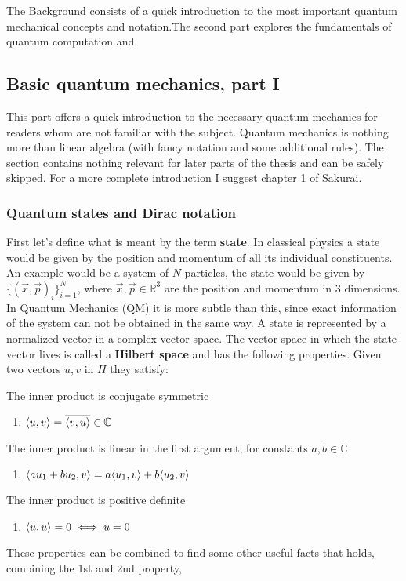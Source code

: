 The Background consists of a quick introduction to the most important quantum mechanical concepts and notation.The second part explores the fundamentals of quantum computation and 

\subsection{Basic quantum mechanics, part I}
This part offers a quick introduction to the necessary quantum mechanics for readers whom are not familiar with the subject. Quantum mechanics is nothing more than linear algebra (with fancy notation and some additional rules). The section contains nothing relevant for later parts of the thesis and can be safely skipped. For a more complete introduction I suggest chapter 1 of Sakurai\cite{Sakurai}.


\subsubsection{Quantum states and Dirac notation}
First let's define what is meant by the term \textbf{state}. In classical physics a state would be given by the position and momentum of all its individual constituents. An example would be a system of $N$ particles, the state would be given by $\{ (\vec{x}, \vec{p})_i \}_{i=1}^N$, where $\vec{x},\vec{p} \in \mathbb{R}^3$ are the position and momentum in 3 dimensions. In Quantum Mechanics (QM) it is more subtle than this, since exact information of the system can not be obtained in the same way. A state is represented by a normalized vector in a complex vector space. The vector space in which the state vector lives is called a \textbf{Hilbert space} and has the following properties. Given two vectors $u,v$ in $H$ they satisfy:

\noindent The inner product is conjugate symmetric
\begin{enumerate}
\item $\langle u,v \rangle = \overline{\langle v,u \rangle} \in \mathbb{C}$
\end{enumerate}
The inner product is linear in the first argument, for constants $a,b\in \mathbb{C}$
\begin{enumerate}[resume]
\item $\langle au_1 + bu_2,v \rangle = a\langle u_1,v \rangle + b\langle u_2,v \rangle$
\end{enumerate}
The inner product is positive definite 
\begin{enumerate}[resume]
\item $\langle u,u \rangle = 0 \iff u = 0$
\end{enumerate}
These properties can be combined to find some other useful facts that holds,
combining the 1st and 2nd property,

